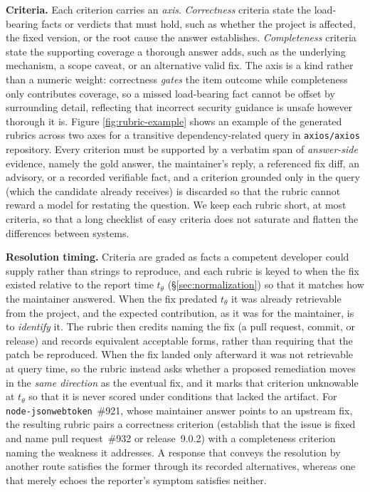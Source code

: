 \noindent\textbf{Criteria.}
Each criterion carries an \emph{axis}. \emph{Correctness} criteria state the
load-bearing facts or verdicts that must hold, such as whether the project is
affected, the fixed version, or the root cause the answer establishes.
\emph{Completeness} criteria state the supporting coverage a thorough answer
adds, such as the underlying mechanism, a scope caveat, or an alternative valid
fix. The axis is a kind rather than a numeric weight: correctness \emph{gates}
the item outcome while completeness only contributes coverage, so a missed
load-bearing fact cannot be offset by surrounding detail, reflecting that
incorrect security guidance is unsafe however thorough it is. Figure \ref{fig:rubric-example} shows an example of the generated rubrics across two axes for a transitive dependency-related query in \texttt{axios/axios} repository. Every
criterion must be supported by a verbatim span of \emph{answer-side} evidence,
namely the gold answer, the maintainer's reply, a referenced fix diff, an
advisory, or a recorded verifiable fact, and a criterion grounded only in the
query (which the candidate already receives) is discarded so that the rubric
cannot reward a model for restating the question. We keep each rubric short, at
most  criteria, so that a long checklist of easy criteria does not
saturate and flatten the differences between systems.



\noindent\textbf{Resolution timing.}
Criteria are graded as facts a competent developer could supply rather than
strings to reproduce, and each rubric is keyed to when the fix existed relative
to the report time $t_\theta$ (\S\ref{sec:normalization}) so that it matches how
the maintainer answered. When the fix predated $t_\theta$ it was already
retrievable from the project, and the expected contribution, as it was for the
maintainer, is to \emph{identify} it. The rubric then credits naming the fix (a
pull request, commit, or release) and records equivalent acceptable forms,
rather than requiring that the patch be reproduced. When the fix landed only
afterward it was not retrievable at query time, so the rubric instead asks
whether a proposed remediation moves in the \emph{same direction} as the
eventual fix, and it marks that criterion unknowable at $t_\theta$ so that it is
never scored under conditions that lacked the artifact. For
\texttt{node-jsonwebtoken}~\#921, whose maintainer answer points to an upstream
fix, the resulting rubric pairs a correctness criterion (establish that the issue
is fixed and name pull request~\#932 or release~9.0.2) with a completeness
criterion naming the weakness it addresses. A response that conveys the
resolution by another route satisfies the former through its recorded
alternatives, whereas one that merely echoes the reporter's symptom satisfies
neither.

